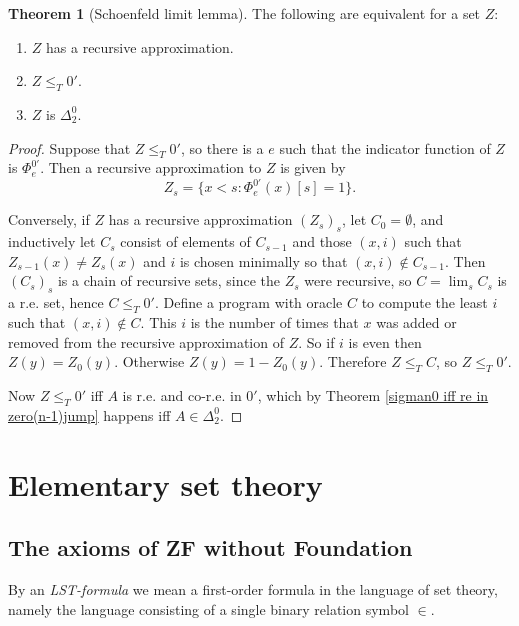 \documentclass[12pt]{report}
\newcommand{\dfn}[1]{\emph{#1}\index{#1}}
\theoremstyle{definition}
\newtheorem{theorem}{Theorem}[chapter]
\begin{document}
\begin{theorem}[Schoenfeld limit lemma]
  The following are equivalent for a set $Z$:
\begin{enumerate}
\item $Z$ has a recursive approximation.
\item $Z \leq_T 0'$.
\item $Z$ is $\Delta_2^0$.
\end{enumerate}
\end{theorem}
\begin{proof}
Suppose that $Z \leq_T 0'$, so there is a $e$ such that the indicator function of $Z$ is $\Phi_e^{0'}$. Then a recursive approximation to $Z$ is given by
$$Z_s = \{x < s: \Phi_e^{0'}(x)[s] = 1\}.$$

Conversely, if $Z$ has a recursive approximation $(Z_s)_s$, let $C_0 = \emptyset$, and inductively let $C_s$ consist of elements of $C_{s-1}$ and those $(x, i)$ such that $Z_{s-1}(x) \neq Z_s(x)$ and $i$ is chosen minimally so that $(x, i) \notin C_{s-1}$. Then $(C_s)_s$ is a chain of recursive sets, since the $Z_s$ were recursive, so $C = \lim_s C_s$ is a r.e. set, hence $C \leq_T 0'$. Define a program with oracle $C$ to compute the least $i$ such that $(x, i) \notin C$.
This $i$ is the number of times that $x$ was added or removed from the recursive approximation of $Z$. So if $i$ is even then $Z(y) = Z_0(y)$. Otherwise $Z(y) = 1 - Z_0(y)$. Therefore $Z \leq_T C$, so $Z \leq_T 0'$.

Now $Z \leq_T 0'$ iff $A$ is r.e. and co-r.e. in $0'$, which by Theorem \ref{sigman0 iff re in zero(n-1)jump} happens iff $A \in \Delta_2^0$.
\end{proof}



\chapter{Elementary set theory}
\section{The axioms of ZF without Foundation}
By an \dfn{LST-formula} we mean a first-order formula in the language of set theory, namely the language consisting of a single binary relation symbol $\in$.
\end{document}
